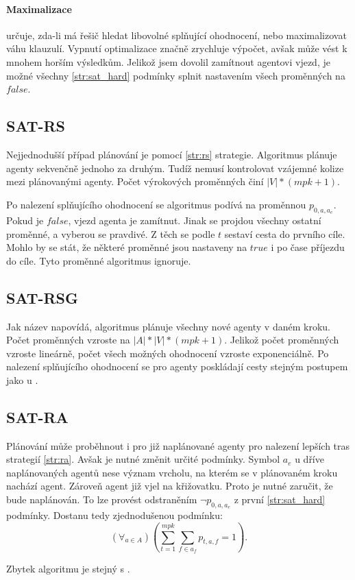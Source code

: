 \paragraph{Maximalizace} určuje, zda-li má řešič hledat libovolné splňující ohodnocení,
nebo maximalizovat váhu klauzulí.
Vypnutí optimalizace značně zrychluje výpočet, avšak může vést k mnohem horším výsledkům.
Jelikož jsem dovolil zamítnout agentovi vjezd, je možné všechny \ref{str:sat_hard} podmínky splnit
nastavením všech proměnných na $false$.

\subsection{SAT-RS}\label{subsec:sat_rs}

Nejjednodušší případ plánování je pomocí \ref{str:rs} strategie.
Algoritmus plánuje agenty sekvenčně jednoho za druhým.
Tudíž nemusí kontrolovat vzájemné kolize mezi plánovanými agenty.
Počet výrokových proměnných činí $|V| * (mpk + 1)$.

Po nalezení splňujícího ohodnocení se algoritmus podívá na proměnnou $p_{0, a, a_e}$.
Pokud je $false$, vjezd agenta je zamítnut.
Jinak se projdou všechny ostatní proměnné, a vyberou se pravdivé.
Z těch se podle $t$ sestaví cesta do prvního cíle.
Mohlo by se stát, že některé proměnné jsou nastaveny na $true$ i po čase příjezdu do cíle.
Tyto proměnné algoritmus ignoruje.

\subsection{SAT-RSG}\label{subsec:sat_rsg}
Jak název napovídá, algoritmus plánuje všechny nové agenty v daném kroku.
Počet proměnných vzroste na $|A| * |V| * (mpk + 1)$.
Jelikož počet proměnných vzroste lineárně, počet všech možných ohodnocení vzroste exponenciálně.
Po nalezení splňujícího ohodnocení se pro agenty poskládají cesty stejným postupem jako u .

\subsection{SAT-RA}\label{subsec:sat_ra}

Plánování může proběhnout i pro již naplánované agenty pro nalezení lepších tras strategií \ref{str:ra}.
Avšak je nutné změnit určité podmínky.
Symbol $a_e$ u dříve naplánovaných agentů nese význam vrcholu, na kterém se v plánovaném kroku nachází agent.
Zároveň agent již vjel na křižovatku.
Proto je nutné zaručit, že bude naplánován.
To lze provést odstraněním $\neg p_{0, a, a_e}$ z první \ref{str:sat_hard} podmínky.
Dostanu tedy zjednodušenou podmínku:
\[
	(\forall_{a \in A}) \left(\sum_{t=1}^{mpk} \sum_{f \in a_f} p_{t, a, f} = 1\right).
\]

Zbytek algoritmu je stejný s .
